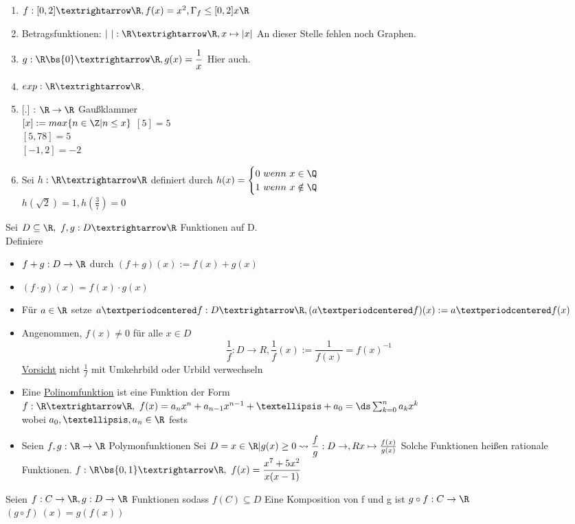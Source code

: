 \begin{enumerate}
\item{$f:[0,2]→\R, f(x)=x^2, \Gamma_f \leq [0,2] x\R$}
\item{Betragsfunktionen: $|\ |: \R→\R, x\mapsto|x|$
}
An dieser Stelle fehlen noch Graphen.
\item{$g:\R\bs\{0\}→\R, g(x)=\dfrac{1}{x}$
Hier auch.
}
\item{$exp:\R→\R$.}
\item{[.] : $\R \to \R$ Gaußklammer\\
$[x] := max\{n \in \Z | n \leq x \}$
\bsp
$[5] = 5$\\
$[5,78] = 5$\\
$[-1,2] = -2$}
\item{Sei $h:\R→\R$ definiert durch $h(x)=\begin{cases}0\ wenn\ x\in\Q\\ 1\ wenn\ x\notin\Q\end{cases}$\\
$h(\sqrt{2}) = 1, h (\frac{3}{7}) = 0$}
\end{enumerate}
%
Sei $D \subseteq \R , \ f,g: D→\R$ Funktionen auf D.\\
Definiere
\begin{itemize}
\item{$f+g: D \to \R$ durch $(f + g)(x) := f(x) + g(x)$}
\item{$(f \cdot  g) (x) = f(x) \cdot g(x)$}
\item{Für $a\in\R$ setze $a·f: D→\R, (a·f)(x):=a·f(x)$}
\item{Angenommen, $f(x) \neq 0$ für alle $x \in D$ \\
$$\frac{1}{f}: D \to R, \frac{1}{f}(x) := \frac{1}{f(x)} = f(x)^{-1}$$
\underline{\underline{Vorsicht}} nicht $\frac{1}{f}$ mit Umkehrbild oder Urbild verwechseln}
\end{itemize}
%
\begin{itemize}
\item{Eine \underline{Polinomfunktion} ist eine Funktion der Form\\
$f: \R → \R,\ f(x) = a_n x^n+a_{n-1}x^{n-1}+…+a_0=\ds\sum_{k=0}^n a_k x^k $\\
wobei $a_0,…,a_n \in \R$ fest}s
%
\item{Seien $f, g : \R \to \R $ Polymonfunktionen
Sei $D = {x \in \R | g(x) \geq 0}\leadsto \dfrac{f}{g} : D \to , Rx \mapsto \frac{f(x)}{g(x)}$
Solche Funktionen heißen rationale Funktionen.
\bsp
$f:\R\bs\{0,1\}→\R, \ f(x)=\dfrac{x^7+5x^2}{x(x-1)}$}
\end{itemize}
Seien $f: C \to \R, g: D \to \R$ Funktionen sodass $f(C) \subseteq D$
Eine Komposition von f und g ist 
%
$g \circ f : C \to \R$\\
$(g \circ f) \ (x) = g(f(x))$